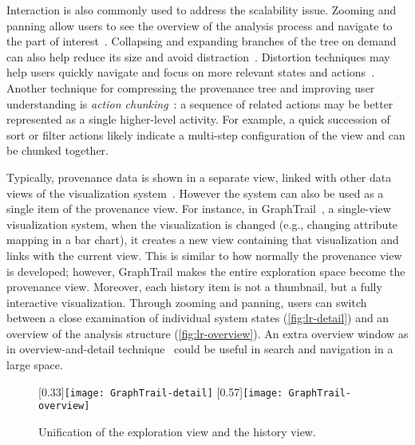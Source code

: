 Interaction is also commonly used to address the scalability issue. Zooming and panning allow users to see the overview of the analysis process and navigate to the part of interest~\cite{Dunne2012}. Collapsing and expanding branches of the tree on demand can also help reduce its size and avoid distraction~\cite{Bavoil2005}. Distortion techniques may help users quickly navigate and focus on more relevant states and actions~\cite{Meng1998}. Another technique for compressing the provenance tree and improving user understanding is \emph{action chunking}~\cite{Heer2008}: a sequence of related actions may be better represented as a single higher-level activity. For example, a quick succession of sort or filter actions likely indicate a multi-step configuration of the view and can be chunked together. 

Typically, provenance data is shown in a separate view, linked with other data views of the visualization system~\cite{Shrinivasan2008,Heer2008,Pike2009,Kadivar2009}. However the system can also be used as a single item of the provenance view. For instance, in GraphTrail~\cite{Dunne2012}, a single-view visualization system, when the visualization is changed (e.g., changing attribute mapping in a bar chart), it creates a new view containing that visualization and links with the current view. This is similar to how normally the provenance view is developed; however, GraphTrail makes the entire exploration space become the provenance view. Moreover, each history item is not a thumbnail, but a fully interactive visualization. Through zooming and panning, users can switch between a close examination of individual system states (\autoref{fig:lr-detail}) and an overview of the analysis structure (\autoref{fig:lr-overview}). An extra overview window as in overview-and-detail technique~\cite{Cockburn2008} could be useful in search and navigation in a large space.

\begin{figure}[!htb]
\centering
{}[0.33\columnwidth]{\texttt{[image: GraphTrail-detail]}} 
\hfill
{}[0.57\columnwidth]{\texttt{[image: GraphTrail-overview]}}
\caption[Unification of the exploration view and the history view]{Unification of the exploration view and the history view. }
\end{figure}

